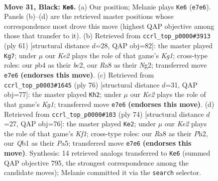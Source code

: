 \documentclass[11pt]{article}
\begin{document}
\clearpage

\begin{figure}[p]\centering
\begin{subfigure}{0.46\textwidth}\centering
\resizebox{\linewidth}{!}{%
\newchessgame
\chessboard[
  setfen={r7/2p1k1Qp/3p1p2/8/pP6/6P1/P4PKP/1q6 b - - 1 31},
  showmover=false,
  pgfstyle=straightmove, color=movearrow, markmove={e7-e6}
]}
\caption{}
\end{subfigure}\hfill
\begin{subfigure}{0.46\textwidth}\centering
\resizebox{\linewidth}{!}{%
\newchessgame
\chessboard[
  setfen={4Q1k1/2p2p1p/6p1/8/1q1P4/4PP2/2B1KPnP/8 b - - 2 31},
  showmover=false,
  pgfstyle=straightmove, color=movearrow, markmove={g8-g7}
]}
\caption{}
\end{subfigure}
\\[4pt]
\begin{subfigure}{0.46\textwidth}\centering
\resizebox{\linewidth}{!}{%
\newchessgame
\chessboard[
  setfen={6k1/5p1p/6p1/1Q2p3/4P3/P3q2P/1P4P1/6K1 w - - 5 39},
  showmover=false,
  pgfstyle=straightmove, color=movearrow, markmove={g1-h2}
]}
\caption{}
\end{subfigure}\hfill
\begin{subfigure}{0.46\textwidth}\centering
\resizebox{\linewidth}{!}{%
\newchessgame
\chessboard[
  setfen={2Q5/1p4pk/p2p3p/P7/4p1P1/1P6/2P2P1P/5K1q w - - 5 38},
  showmover=false,
  pgfstyle=straightmove, color=movearrow, markmove={f1-e2}
]}
\caption{}
\end{subfigure}
\caption{\textbf{Move 31, Black: \texttt{Ke6}.} (a) Our position; Melanie plays \texttt{Ke6} (\texttt{e7e6}). Panels (b)--(d) are the retrieved master positions whose correspondence most drove this move (highest QAP objective among those that transfer to it). (b) Retrieved from \texttt{ccrl\_top\_p0000\#3913} (ply 61) [structural distance $d$=28, QAP obj=82]: the master played \texttt{Kg7}; under $\mu$ our \emph{Ke2} plays the role of that game's \emph{Kg1}; cross-type roles: our \emph{p}b4 as their \emph{b}c2, our \emph{R}a8 as their \emph{N}g2; transferred move \texttt{e7e6} \textbf{(endorses this move)}. (c) Retrieved from \texttt{ccrl\_top\_p0003\#1645} (ply 76) [structural distance $d$=31, QAP obj=77]: the master played \texttt{Kh2}; under $\mu$ our \emph{Ke2} plays the role of that game's \emph{Kg1}; transferred move \texttt{e7e6} \textbf{(endorses this move)}. (d) Retrieved from \texttt{ccrl\_top\_p0000\#103} (ply 74) [structural distance $d$=27, QAP obj=76]: the master played \texttt{Ke2}; under $\mu$ our \emph{Ke2} plays the role of that game's \emph{Kf1}; cross-type roles: our \emph{R}a8 as their \emph{P}h2, our \emph{Q}b1 as their \emph{P}a5; transferred move \texttt{e7e6} \textbf{(endorses this move)}. Synthesis: 14 retrieved analogs transferred to \texttt{Ke6} (summed QAP objective 795, the strongest correspondence among the candidate moves); Melanie committed it via the \texttt{search} selector.}
\label{fig:thought-m61}
\end{figure}
\end{document}

